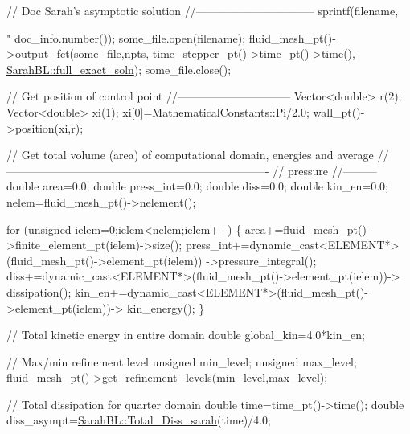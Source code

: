 \begin{DoxyCodeInclude}
{{ \textcolor{comment}{// Doc Sarah's asymptotic solution }
 \textcolor{comment}{//--------------------------------}
 sprintf(filename,\textcolor{stringliteral}{"%
         doc\_info.number());
 some\_file.open(filename);
 fluid\_mesh\_pt()->output\_fct(some\_file,npts,
                       time\_stepper\_pt()->time\_pt()->time(), 
                       \hyperlink{namespaceoomph_1_1SarahBL_a80c7c03073f6436ace00d2b2c5bfa501}{SarahBL::full\_exact\_soln});
 some\_file.close();




 \textcolor{comment}{// Get position of control point}
 \textcolor{comment}{//------------------------------}
 Vector<double> r(2);
 Vector<double> xi(1);
 xi[0]=MathematicalConstants::Pi/2.0;
 wall\_pt()->position(xi,r);



 \textcolor{comment}{// Get total volume (area) of computational domain, energies and average}
 \textcolor{comment}{//----------------------------------------------------------------------}
 \textcolor{comment}{// pressure}
 \textcolor{comment}{//---------}
 \textcolor{keywordtype}{double} area=0.0;
 \textcolor{keywordtype}{double} press\_int=0.0;
 \textcolor{keywordtype}{double} diss=0.0;
 \textcolor{keywordtype}{double} kin\_en=0.0;
 nelem=fluid\_mesh\_pt()->nelement();

 \textcolor{keywordflow}{for} (\textcolor{keywordtype}{unsigned} ielem=0;ielem<nelem;ielem++)
  \{
   area+=fluid\_mesh\_pt()->finite\_element\_pt(ielem)->size();
   press\_int+=\textcolor{keyword}{dynamic\_cast<}ELEMENT*\textcolor{keyword}{>}(fluid\_mesh\_pt()->element\_pt(ielem))
    ->pressure\_integral();
   diss+=\textcolor{keyword}{dynamic\_cast<}ELEMENT*\textcolor{keyword}{>}(fluid\_mesh\_pt()->element\_pt(ielem))->
    dissipation();
   kin\_en+=\textcolor{keyword}{dynamic\_cast<}ELEMENT*\textcolor{keyword}{>}(fluid\_mesh\_pt()->element\_pt(ielem))->
    kin\_energy();
  \}

 \textcolor{comment}{// Total kinetic energy in entire domain}
 \textcolor{keywordtype}{double} global\_kin=4.0*kin\_en;

 \textcolor{comment}{// Max/min refinement level}
 \textcolor{keywordtype}{unsigned} min\_level;
 \textcolor{keywordtype}{unsigned} max\_level;
 fluid\_mesh\_pt()->get\_refinement\_levels(min\_level,max\_level);


 \textcolor{comment}{// Total dissipation for quarter domain}
 \textcolor{keywordtype}{double} time=time\_pt()->time();
 \textcolor{keywordtype}{double} diss\_asympt=\hyperlink{namespaceoomph_1_1SarahBL_abcbefc8bfea90a749dcb6961d9d5c0a0}{SarahBL::Total\_Diss\_sarah}(time)/4.0;

}}}
\end{DoxyCodeInclude}
